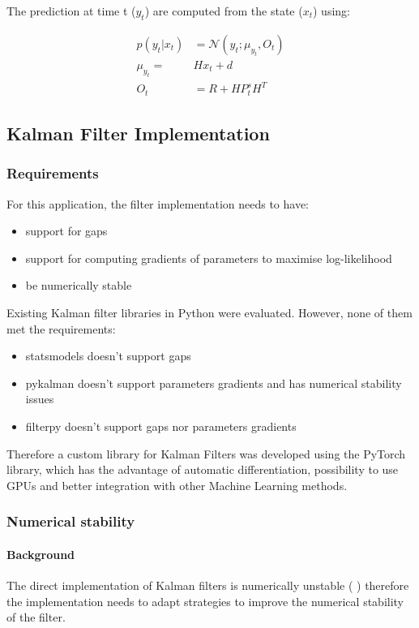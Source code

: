 \documentclass{article}
\newcommand{\norm}[3]{\mathcal{N}\left(#1; #2, #3\right)} %
\let\Oldsubsection\subsection
\renewcommand{\subsection}{\FloatBarrier\Oldsubsection}
\let\Oldsubsubsection\subsubsection
\renewcommand{\subsubsection}{\FloatBarrier\Oldsubsubsection}
\begin{document}
The prediction at time t ($y_t$) are computed from the state ($x_t$) using:

\begin{align}\label{filter_predictions}
    p(y_t|x_t) &= \norm{y_t}{\mu_{y_t}}{O_t} \\
    \mu_{y_t} =& Hx_t + d \\
    O_t &= R + HP^s_tH^T
\end{align}


\subsection{Kalman Filter Implementation}

\subsubsection{Requirements}

For this application, the filter implementation needs to have:

\begin{itemize}
    \item support for gaps
    \item support for computing gradients of parameters to maximise log-likelihood
    \item be numerically stable
\end{itemize}

Existing Kalman filter libraries in Python were evaluated. However, none of them met the requirements:
\begin{itemize}
    \item statsmodels doesn't support gaps
    \item pykalman doesn't support parameters gradients and has numerical stability issues
    \item filterpy doesn't support gaps nor parameters gradients 
\end{itemize}
Therefore a custom library for Kalman Filters was developed using the PyTorch library, which has the advantage of automatic differentiation, possibility to use GPUs and better integration with other Machine Learning methods.

\subsubsection{Numerical stability}

\paragraph{Background}
The direct implementation of Kalman filters is numerically unstable (\cite{mohinder_s_grewal_kalman_2001} \cite{dan_simon_optimal_2006}) therefore the implementation needs to adapt strategies to improve the numerical stability of the filter.
\end{document}
